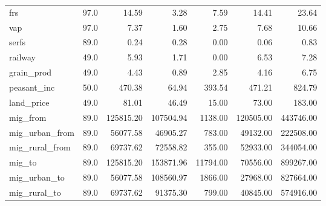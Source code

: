 \begin{longtable}{lrrrrrr}
frs            &         97.0 &       14.59 &               3.28 &      7.59 &       14.41 &       23.64 \\
vap            &         97.0 &        7.37 &               1.60 &      2.75 &        7.68 &       10.66 \\
serfs          &         89.0 &        0.24 &               0.28 &      0.00 &        0.06 &        0.83 \\
railway        &         49.0 &        5.93 &               1.71 &      0.00 &        6.53 &        7.28 \\
grain\_prod     &         49.0 &        4.43 &               0.89 &      2.85 &        4.16 &        6.75 \\
peasant\_inc    &         50.0 &      470.38 &              64.94 &    393.54 &      471.21 &      824.79 \\
land\_price     &         49.0 &       81.01 &              46.49 &     15.00 &       73.00 &      183.00 \\
mig\_from       &         89.0 &   125815.20 &          107504.94 &   1138.00 &   120505.00 &   443746.00 \\
mig\_urban\_from &         89.0 &    56077.58 &           46905.27 &    783.00 &    49132.00 &   222508.00 \\
mig\_rural\_from &         89.0 &    69737.62 &           72558.82 &    355.00 &    52933.00 &   344054.00 \\
mig\_to         &         89.0 &   125815.20 &          153871.96 &  11794.00 &    70556.00 &   899267.00 \\
mig\_urban\_to   &         89.0 &    56077.58 &          108560.97 &   1866.00 &    27968.00 &   827664.00 \\
mig\_rural\_to   &         89.0 &    69737.62 &           91375.30 &    799.00 &    40845.00 &   574916.00 \\
\end{longtable}
